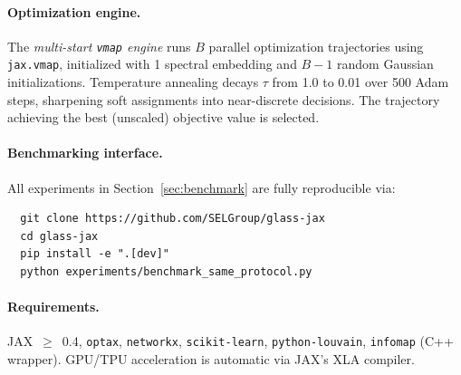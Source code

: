 \paragraph{Optimization engine.}
The \emph{multi-start \texttt{vmap} engine} runs $B$ parallel optimization
trajectories using \texttt{jax.vmap}, initialized with 1 spectral embedding
and $B-1$ random Gaussian initializations.
Temperature annealing decays $\tau$ from 1.0 to 0.01 over 500 Adam steps,
sharpening soft assignments into near-discrete decisions.
The trajectory achieving the best (unscaled) objective value is selected.

\paragraph{Benchmarking interface.}
All experiments in Section~\ref{sec:benchmark} are fully reproducible via:
\begin{verbatim}
  git clone https://github.com/SELGroup/glass-jax
  cd glass-jax
  pip install -e ".[dev]"
  python experiments/benchmark_same_protocol.py
\end{verbatim}

\paragraph{Requirements.}
JAX~$\ge$~0.4, \texttt{optax}, \texttt{networkx}, \texttt{scikit-learn},
\texttt{python-louvain}, \texttt{infomap} (C++ wrapper).
GPU/TPU acceleration is automatic via JAX's XLA compiler.

